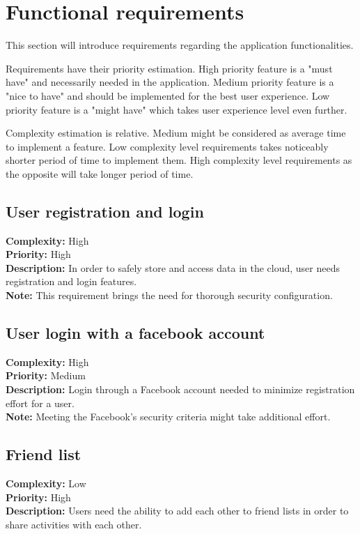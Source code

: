 
\section{Functional requirements}\label{sec:functional-requirements}

This section will introduce requirements regarding the application functionalities.

Requirements have their priority estimation.
High priority feature is a "must have" and necessarily needed in the application.
Medium priority feature is a "nice to have" and should be implemented for the best user experience.
Low priority feature is a "might have" which takes user experience level even further.

Complexity estimation is relative.
Medium might be considered as average time to implement a feature.
Low complexity level requirements takes noticeably shorter period of time to implement them.
High complexity level requirements as the opposite will take longer period of time.

\subsection{User registration and login}\label{subsec:user-registration-and-login}
\textbf{Complexity:} High\\
\textbf{Priority:} High\\
\textbf{Description:} In order to safely store and access data in the cloud, user needs registration and login features.\\
\textbf{Note:} This requirement brings the need for thorough security configuration.\\


\subsection{User login with a facebook account}\label{subsec:user-login-with-facebook-account}
\textbf{Complexity:} High\\
\textbf{Priority:} Medium\\
\textbf{Description:} Login through a Facebook account needed to minimize registration effort for a user.\\
\textbf{Note:} Meeting the Facebook's security criteria might take additional effort.\\


\subsection{Friend list}\label{subsec:friend-list}
\textbf{Complexity:} Low\\
\textbf{Priority:} High\\
\textbf{Description:} Users need the ability to add each other to friend lists in order to share activities with each other.\\


